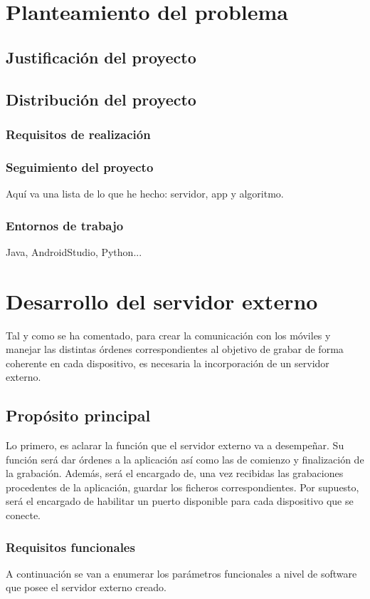 \documentclass[a4paper,11pt]{book}
\begin{document}
\chapter{Planteamiento del problema}
	\section{Justificación del proyecto}
	\section{Distribución del proyecto}
		\subsection{Requisitos de realización}
		\subsection{Seguimiento del proyecto}
		Aquí va una lista de lo que he hecho: servidor, app y algoritmo.
		\subsection{Entornos de trabajo}
		Java, AndroidStudio, Python...

\chapter{Desarrollo del servidor externo}
	Tal y como se ha comentado, para crear la comunicación con los móviles y manejar las distintas órdenes correspondientes al objetivo de grabar de forma coherente en cada dispositivo, es necesaria la incorporación de un servidor externo.
	
	
		\section{Propósito principal}
			Lo primero, es aclarar la función que el servidor externo va a desempeñar. Su función será dar órdenes a la aplicación así como las de comienzo y finalización de la grabación. Además, será el encargado de, una vez recibidas las grabaciones procedentes de la aplicación, guardar los ficheros correspondientes. Por supuesto, será el encargado de habilitar un puerto disponible para cada dispositivo que se conecte.
			
			
			\subsection{Requisitos funcionales}
				A continuación se van a enumerar los parámetros funcionales a nivel de software que posee el servidor externo creado.
				
\end{document}
